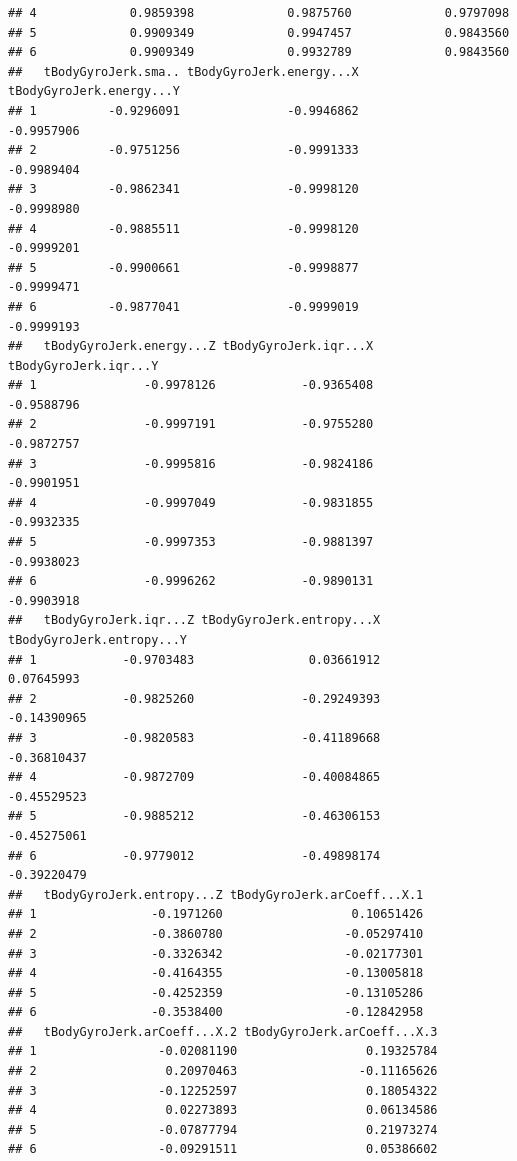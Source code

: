 \documentclass[
]{article}
\begin{document}
\begin{verbatim}
## 4             0.9859398             0.9875760             0.9797098
## 5             0.9909349             0.9947457             0.9843560
## 6             0.9909349             0.9932789             0.9843560
##   tBodyGyroJerk.sma.. tBodyGyroJerk.energy...X tBodyGyroJerk.energy...Y
## 1          -0.9296091               -0.9946862               -0.9957906
## 2          -0.9751256               -0.9991333               -0.9989404
## 3          -0.9862341               -0.9998120               -0.9998980
## 4          -0.9885511               -0.9998120               -0.9999201
## 5          -0.9900661               -0.9998877               -0.9999471
## 6          -0.9877041               -0.9999019               -0.9999193
##   tBodyGyroJerk.energy...Z tBodyGyroJerk.iqr...X tBodyGyroJerk.iqr...Y
## 1               -0.9978126            -0.9365408            -0.9588796
## 2               -0.9997191            -0.9755280            -0.9872757
## 3               -0.9995816            -0.9824186            -0.9901951
## 4               -0.9997049            -0.9831855            -0.9932335
## 5               -0.9997353            -0.9881397            -0.9938023
## 6               -0.9996262            -0.9890131            -0.9903918
##   tBodyGyroJerk.iqr...Z tBodyGyroJerk.entropy...X tBodyGyroJerk.entropy...Y
## 1            -0.9703483                0.03661912                0.07645993
## 2            -0.9825260               -0.29249393               -0.14390965
## 3            -0.9820583               -0.41189668               -0.36810437
## 4            -0.9872709               -0.40084865               -0.45529523
## 5            -0.9885212               -0.46306153               -0.45275061
## 6            -0.9779012               -0.49898174               -0.39220479
##   tBodyGyroJerk.entropy...Z tBodyGyroJerk.arCoeff...X.1
## 1                -0.1971260                  0.10651426
## 2                -0.3860780                 -0.05297410
## 3                -0.3326342                 -0.02177301
## 4                -0.4164355                 -0.13005818
## 5                -0.4252359                 -0.13105286
## 6                -0.3538400                 -0.12842958
##   tBodyGyroJerk.arCoeff...X.2 tBodyGyroJerk.arCoeff...X.3
## 1                 -0.02081190                  0.19325784
## 2                  0.20970463                 -0.11165626
## 3                 -0.12252597                  0.18054322
## 4                  0.02273893                  0.06134586
## 5                 -0.07877794                  0.21973274
## 6                 -0.09291511                  0.05386602

\end{verbatim}
\end{document}
